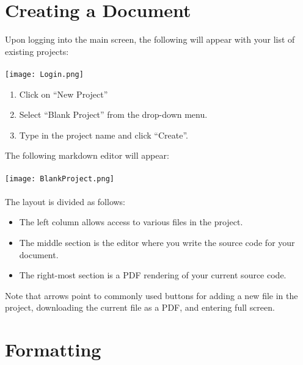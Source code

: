 \documentclass[11pt,onecolumn]{article}
\theoremstyle{definition}
\begin{document}
\pagebreak
\section{Creating a Document}
Upon logging into the main screen, the following will appear with your list of existing projects: \\\\
\texttt{[image: Login.png]} 
\begin{enumerate}
    \item Click on ``New Project'' \\
    \item Select ``Blank Project'' from the drop-down menu. \\
    \item Type in the project name and click ``Create''. \\
\end{enumerate}
\pagebreak 
The following markdown editor will appear: \\\\
\texttt{[image: BlankProject.png]} \\\\
The layout is divided as follows:
\begin{itemize}
    \item The left column allows access to various files in the project. \\
    \item The middle section is the editor where you write the source code for your document. \\
    \item The right-most section is a PDF rendering of your current source code. \\

\end{itemize}
Note that arrows point to commonly used buttons for adding a new file in the project, downloading the current file as a PDF, and entering full screen. \\

\pagebreak
\section{Formatting}
\end{document}
